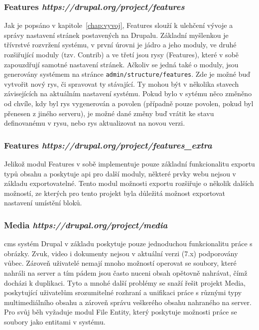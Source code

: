 \subsubsection*{Features \hfill \emph{https://drupal.org/project/features}} 
\label{subsec:features}
Jak je popsáno v kapitole~\ref{chap:vyvoj}, Features slouží k ulehčení vývoje a správy nastavení stránek postavených na Drupalu. Základní myšlenkou je třívrstvé rozvržení systému, v první úrovni je jádro a jeho moduly, ve druhé rozšiřující moduly (tzv. Contrib) a ve třetí jsou rysy (Features), které v sobě zapouzdřují samotné nastavení stránek. Ačkoliv se jedná také o moduly, jsou generovány systémem na stránce \texttt{admin/structure/features}. Zde je možné buď vytvořit nový rys, či spravovat ty stávající. Ty mohou být v několika stavech závisejících na aktuálním nastavení systému. Pokud bylo v sytému něco změněno od chvíle, kdy byl rys vygenerován a povolen (případně pouze povolen, pokud byl přenesen z jiného serveru), je možné dané změny buď vrátit ke stavu definovanému v rysu, nebo rys aktualizovat na novou verzi.

\subsubsection*{Features \hfill \emph{https://drupal.org/project/features\_extra}} 
Jelikož modul Features v sobě implementuje pouze základní funkcionalitu exportu typů obsahu a poskytuje \gls{api} pro další moduly, některé prvky webu nejsou v základu exportovatelné. Tento modul možnosti exportu rozšiřuje o několik dalších možností, ze kterých pro tento projekt byla důležitá možnost exportovat nastavení umístění bloků.

\subsubsection*{Media \hfill \emph{https://drupal.org/project/media}}
\gls{cms} systém Drupal v základu poskytuje pouze jednoduchou funkcionalitu práce s obrázky. Zvuk, video i dokumenty nejsou v aktuální verzi (7.x) podporovány vůbec. Zároveň uživatelé nemají mnoho možností operovat se soubory, které nahráli na server a tím pádem jsou často nuceni obsah opětovně nahrávat, čímž docházi k duplikaci. Tyto a mnohé další problémy se snaží řešit projekt Media, poskytující uživatelům srozumitelné rozhraní a unifikaci práce s různými typy multimediálního obsahu a zároveň správu veškerého obsahu nahraného na server. Pro svůj běh vyžaduje modul File Entity, který poskytuje možnosti práce se soubory jako entitami v systému.

